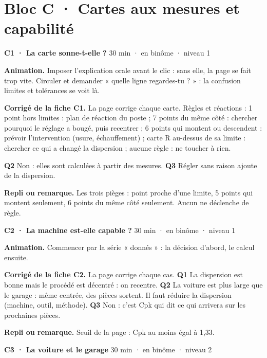 \section*{Bloc C · Cartes aux mesures et capabilité}
\begin{tcolorbox}[act]\textbf{C1 · La carte sonne-t-elle ?} \hfill {\small 30 min · en binôme · niveau 1}\end{tcolorbox}
\textbf{Animation.} Imposer l'explication orale avant le clic : sans elle, la page se fait trop vite. Circuler et demander « quelle ligne regardes-tu ? » : la confusion limites et tolérances se voit là.\par
\textbf{\color{ok}Corrigé de la fiche C1.} La page corrige chaque carte. Règles et réactions : 1 point hors limites : plan de réaction du poste ; 7 points du même côté : chercher pourquoi le réglage a bougé, puis recentrer ; 6 points qui montent ou descendent : prévoir l'intervention (usure, échauffement) ; carte R au-dessus de sa limite : chercher ce qui a changé la dispersion ; aucune règle : ne toucher à rien.\par \textbf{Q2} Non : elles sont calculées à partir des mesures. \textbf{Q3} Régler sans raison ajoute de la dispersion.\par
{\small\textbf{Repli ou remarque.} Les trois pièges : point proche d'une limite, 5 points qui montent seulement, 6 points du même côté seulement. Aucun ne déclenche de règle.}\par
\vspace{3pt}
\begin{tcolorbox}[act]\textbf{C2 · La machine est-elle capable ?} \hfill {\small 30 min · en binôme · niveau 1}\end{tcolorbox}
\textbf{Animation.} Commencer par la série « donnés » : la décision d'abord, le calcul ensuite.\par
\textbf{\color{ok}Corrigé de la fiche C2.} La page corrige chaque cas. \textbf{Q1} La dispersion est bonne mais le procédé est décentré : on recentre. \textbf{Q2} La voiture est plus large que le garage : même centrée, des pièces sortent. Il faut réduire la dispersion (machine, outil, méthode). \textbf{Q3} Non : c'est Cpk qui dit ce qui arrivera sur les prochaines pièces.\par
{\small\textbf{Repli ou remarque.} Seuil de la page : Cpk au moins égal à 1,33.}\par
\vspace{3pt}
\begin{tcolorbox}[act]\textbf{C3 · La voiture et le garage} \hfill {\small 30 min · en binôme · niveau 2}\end{tcolorbox}
